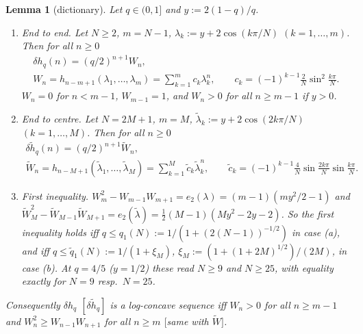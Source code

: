 \documentclass[11pt,a4paper]{article}
\newtheorem{lemma}[theorem]{Lemma}
\theoremstyle{definition}
\begin{document}
\begin{lemma}[dictionary]\label{lem:dict}
Let $q\in(0,1]$ and $y:=2(1-q)/q$.
\begin{enumerate}
\item[(a)] \emph{End to end.} Let $N\ge2$, $m=N-1$, $\lambda_k:=y+2\cos(k\pi/N)$ $(k=1,\dots,m)$. Then for all $n\ge0$
\begin{gather*}
\delta h_q(n)=(q/2)^{n+1}W_n,\\
W_n=h_{n-m+1}(\lambda_1,\dots,\lambda_m)=\sum_{k=1}^mc_k\lambda_k^n,\qquad c_k=(-1)^{k-1}\tfrac2N\sin^2\tfrac{k\pi}N .
\end{gather*}
$W_n=0$ for $n<m-1$, $W_{m-1}=1$, and $W_n>0$ for all $n\ge m-1$ if $y>0$.
\item[(b)] \emph{End to centre.} Let $N=2M+1$, $m=M$, $\tilde\lambda_k:=y+2\cos(2k\pi/N)$ $(k=1,\dots,M)$. Then for all $n\ge0$
\begin{gather*}
\delta\tilde h_q(n)=(q/2)^{n+1}\tilde W_n,\\
\tilde W_n=h_{n-M+1}(\tilde\lambda_1,\dots,\tilde\lambda_M)=\sum_{k=1}^M\tilde c_k\tilde\lambda_k^n,\qquad\tilde c_k=(-1)^{k-1}\tfrac4N\sin\tfrac{2k\pi}N\sin\tfrac{k\pi}N .
\end{gather*}
\item[(c)] \emph{First inequality.} $W_m^2-W_{m-1}W_{m+1}=e_2(\lambda)=(m-1)(my^2/2-1)$ and $\tilde W_M^2-\tilde W_{M-1}\tilde W_{M+1}=e_2(\tilde\lambda)=\tfrac12(M-1)(My^2-2y-2)$. So the first inequality holds iff $q\le q_1(N):=1/(1+(2(N-1))^{-1/2})$ in case (a), and iff $q\le\tilde q_1(N):=1/(1+\xi_M)$, $\xi_M:=(1+(1+2M)^{1/2})/(2M)$, in case (b). At $q=4/5$ ($y=1/2$) these read $N\ge9$ and $N\ge25$, with equality exactly for $N=9$ resp.\ $N=25$.
\end{enumerate}
Consequently $\delta h_q$ $[\delta\tilde h_q]$ is a log-concave sequence iff $W_n>0$ for all $n\ge m-1$ and $W_n^2\ge W_{n-1}W_{n+1}$ for all $n\ge m$ $[$same with $\tilde W]$.
\end{lemma}
\end{document}
